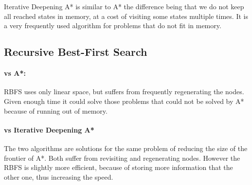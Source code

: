Iterative Deepening A* is similar to A* the difference being that we do not keep all reached states in memory, at a cost of visiting some states multiple times. It is a very frequently used algorithm for problems that do not fit in memory.


\subsection{Recursive Best-First Search}

\paragraph{vs A*:} 

RBFS uses only linear space, but suffers from frequently regenerating the nodes. Given enough time it could solve those problems that could not be solved by A* because of running out of memory.

\paragraph{vs Iterative Deepening A*}

The two algorithms are solutions for the same problem of reducing the size of the frontier of A*. Both suffer from revisiting  and regenerating nodes. However the RBFS is slightly more efficient, because of storing more information that the other one, thus increasing the speed.
